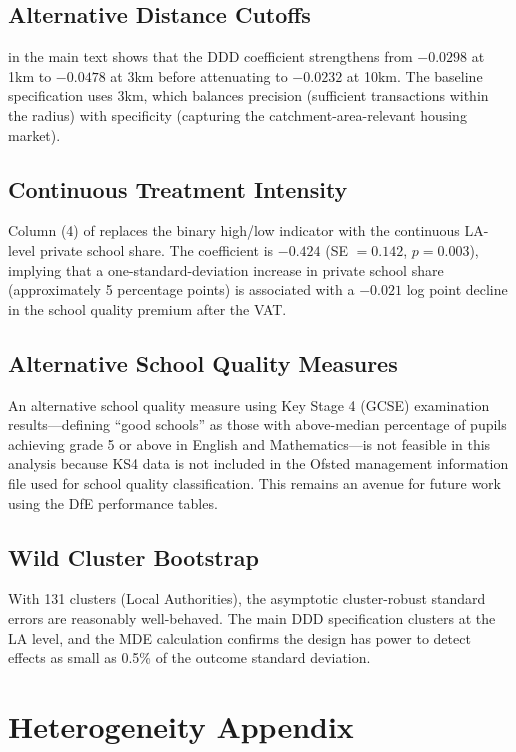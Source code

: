 \documentclass[12pt]{article}
\begin{document}
\subsection{Alternative Distance Cutoffs}

 in the main text shows that the DDD coefficient strengthens from $-0.0298$ at 1km to $-0.0478$ at 3km before attenuating to $-0.0232$ at 10km. The baseline specification uses 3km, which balances precision (sufficient transactions within the radius) with specificity (capturing the catchment-area-relevant housing market).

\subsection{Continuous Treatment Intensity}

Column (4) of  replaces the binary high/low indicator with the continuous LA-level private school share. The coefficient is $-0.424$ (SE $= 0.142$, $p = 0.003$), implying that a one-standard-deviation increase in private school share (approximately 5 percentage points) is associated with a $-0.021$ log point decline in the school quality premium after the VAT.

\subsection{Alternative School Quality Measures}

An alternative school quality measure using Key Stage 4 (GCSE) examination results---defining ``good schools'' as those with above-median percentage of pupils achieving grade 5 or above in English and Mathematics---is not feasible in this analysis because KS4 data is not included in the Ofsted management information file used for school quality classification. This remains an avenue for future work using the DfE performance tables.

\subsection{Wild Cluster Bootstrap}

With 131 clusters (Local Authorities), the asymptotic cluster-robust standard errors are reasonably well-behaved. The main DDD specification clusters at the LA level, and the MDE calculation confirms the design has power to detect effects as small as 0.5\% of the outcome standard deviation.


\section{Heterogeneity Appendix}\label{app:heterogeneity}
\end{document}
